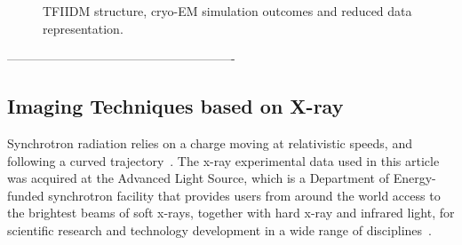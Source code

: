 \begin{figure}[!t]
\centering
{}
\hfil
{}
\caption{TFIIDM structure, cryo-EM simulation outcomes and reduced data representation.}
\label{fig:cryo2}
\end{figure}

-------------------------------------------------------
\subsection{Imaging Techniques based on X-ray}


Synchrotron radiation relies on a charge moving at relativistic speeds, and following a curved trajectory~\cite{url:als:booklet}. The x-ray experimental data used in this article was acquired at the Advanced Light Source, which is a Department of Energy-funded synchrotron facility that provides users from around the world access to the brightest beams of soft x-rays, together with hard x-ray and infrared light, for scientific research and technology development in a wide range of disciplines~\cite{url:als}.

